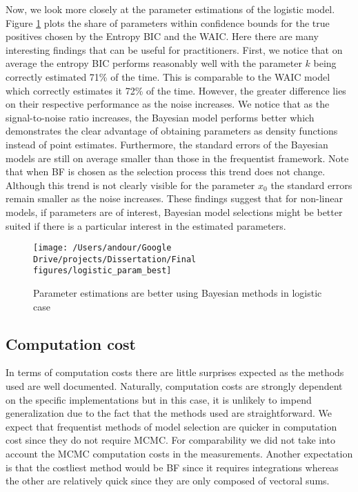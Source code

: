 \documentclass[12pt,]{article}
\begin{document}
Now, we look more closely at the parameter estimations of the logistic model. Figure \ref{fig:param} plots the share of parameters within confidence bounds for the true positives chosen by the Entropy BIC and the WAIC. Here there are many interesting findings that can be useful for practitioners. First, we notice that on average the entropy BIC performs reasonably well with the parameter \(k\) being correctly estimated 71\% of the time. This is comparable to the WAIC model which correctly estimates it 72\% of the time. However, the greater difference lies on their respective performance as the noise increases. We notice that as the signal-to-noise ratio increases, the Bayesian model performs better which demonstrates the clear advantage of obtaining parameters as density functions instead of point estimates. Furthermore, the standard errors of the Bayesian models are still on average smaller than those in the frequentist framework. Note that when BF is chosen as the selection process this trend does not change. Although this trend is not clearly visible for the parameter \(x_0\) the standard errors remain smaller as the noise increases. These findings suggest that for non-linear models, if parameters are of interest, Bayesian model selections might be better suited if there is a particular interest in the estimated parameters.

\begin{figure}

{\centering \texttt{[image: /Users/andour/Google Drive/projects/Dissertation/Final figures/logistic\_param\_best]} 

}

\caption{Parameter estimations are better using Bayesian methods in logistic case}\label{fig:param}
\end{figure}

\hypertarget{computation-cost}{%
\subsection{Computation cost}\label{computation-cost}}

In terms of computation costs there are little surprises expected as the methods used are well documented. Naturally, computation costs are strongly dependent on the specific implementations but in this case, it is unlikely to impend generalization due to the fact that the methods used are straightforward. We expect that frequentist methods of model selection are quicker in computation cost since they do not require MCMC. For comparability we did not take into account the MCMC computation costs in the measurements. Another expectation is that the costliest method would be BF since it requires integrations whereas the other are relatively quick since they are only composed of vectoral sums.
\end{document}
